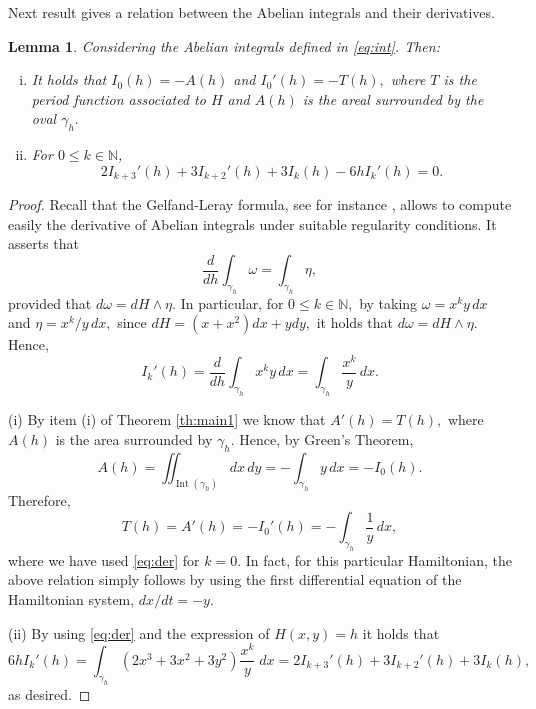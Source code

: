 \documentclass[12pt,a4paper,reqno]{amsart}
\newcommand{\N}{\mathbb{N}}
\newtheorem{lema}[teo]{Lemma}
\begin{document}
    \medskip

Next result gives a relation between the Abelian integrals and their
derivatives.

 \begin{lema}\label{propquerelacionaIkcomI0}
        Considering the  Abelian integrals defined in
        \eqref{eq:int}. Then:
        \begin{enumerate}[(i)]
            \item  It holds that $I_0(h)=-A(h)$ and $I_0'(h)=-T(h),$
             where $T$ is the period function associated to $H$ and
             $A(h)$ is the areal surrounded by the oval $\gamma_h.$



            \item  For $0\leq k\in\N$,
            \begin{equation}\label{eq:deriv}
            2I_{k+3}'(h) + 3I_{k+2}'(h) +
            3I_k(h)-6h I_k'(h)=0.
            \end{equation}

        \end{enumerate}
    \end{lema}


    \begin{proof} Recall that the Gelfand-Leray formula, see for
    instance \cite[Thm. 26.32]{IlyYak2008}, allows to compute easily
    the derivative of Abelian integrals under suitable regularity
    conditions. It asserts that
    \[
\frac{d}{dh} \int_{\gamma_h} \omega =\int_{\gamma_h} \eta,
    \]
provided that $d\omega=dH\wedge \eta.$ In particular, for $0\le
k\in\N,$ by taking $\omega=x^ky\,dx$  and $\eta= x^k/y\, dx,$ since
$dH=(x+x^2)dx+ydy,$ it holds that $d\omega=dH\wedge \eta.$ Hence,
\begin{equation}\label{eq:der}
I_k'(h)=\frac{d}{dh} \int_{\gamma_h} x^ky\,dx =\int_{\gamma_h}
\frac{x^k}y\,dx.
\end{equation}

(i) By item (i) of Theorem \ref{th:main1} we know that $A'(h)=T(h),$
where $A(h)$ is the area surrounded by $\gamma_h.$ Hence, by Green's
Theorem,
\[
A(h)= \iint_{\operatorname{Int}(\gamma_h)} dx\,dy= -\int_{\gamma_h}
y\,dx=-I_0(h).
\]
Therefore,
\[
T(h)=A'(h)=-I_0'(h)=-\int_{\gamma_h} \frac{1}y\,dx,
\]
where we have used \eqref{eq:der} for $k=0.$ In fact, for this
particular Hamiltonian, the above relation simply follows by using
the first differential equation of the Hamiltonian system,
$dx/dt=-y.$

(ii)    By using \eqref{eq:der} and the expression of $H(x,y)=h$  it
holds that
            \begin{equation*}
            6h I_k'(h)= \displaystyle\int_{\gamma_h}  \left( 2x^3+3{x^2} + 3{y^2} \right)\dfrac{x^k}{y} \;
             dx = 2I_{k+3}'(h) + 3I_{k+2}'(h) + 3I_{k}(h),
            \end{equation*}
as desired.
\end{proof}
\end{document}
